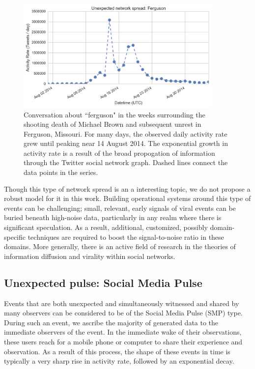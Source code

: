 \documentclass{article}
\begin{document}
\begin{figure}[!b]
\centering
\includegraphics[width=0.9\textwidth]{img/ferguson.png}
\caption{Conversation about ``ferguson" in the weeks surrounding the shooting death of Michael Brown and subsequent unrest in Ferguson, Missouri. For many days, the observed daily activity rate grew until peaking near 14 August 2014. The exponential growth in activity rate is a result of the broad propogation of information through the Twitter social network graph. Dashed lines connect the data points in the series.}
\label{fig:ferguson}
\end{figure}

Though this type of network spread is an a interesting topic, we do not propose a robust model for it in this work. Building operational systems around this type of events can be challenging; small, relevant, early signals of viral events can be buried beneath high-noise data, particularly in any realm where there is significant speculation. As a result, additional, customized, possibly domain-specific techniques are required to boost the signal-to-noise ratio in these domains. More generally, there is an active field of research in the theories of information diffusion and virality within social networks.\cite{Gruhl2004,Weng2013,BosaghZadeh2013,Ferrara2015} 


\subsection{Unexpected pulse: Social Media Pulse}
\label{sec:models_unex-pulse}


Events that are both unexpected and simultaneously witnessed and shared by many observers can be considered to be of the Social Media Pulse (SMP) type. During such an event, we ascribe the majority of generated data to the immediate observers of the event. In the immediate wake of their observations, these users reach for a mobile phone or computer to share their experience and observation. As a result of this process, the shape of these events in time is typically a very sharp rise in activity rate, followed by an exponential decay. 
\end{document}
